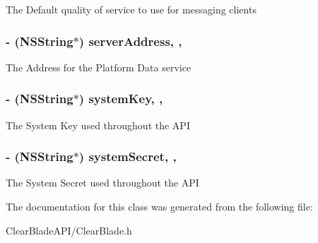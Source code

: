 The Default quality of service to use for messaging clients \hypertarget{interface_clear_blade_a254d692b3e85e4d33a4518e9ff9e4f40}{
\subsubsection[{server\+Address}]{\setlength{\rightskip}{0pt plus 5cm}-\/ (N\+S\+String$\ast$) server\+Address\hspace{0.3cm}{\ttfamily [read]}, {\ttfamily [atomic]}, {\ttfamily [assign]}}}\label{interface_clear_blade_a254d692b3e85e4d33a4518e9ff9e4f40}
The Address for the Platform Data service \hypertarget{interface_clear_blade_aab0eaf0d5cb8cabae0889b19230859b5}{
\subsubsection[{system\+Key}]{\setlength{\rightskip}{0pt plus 5cm}-\/ (N\+S\+String$\ast$) system\+Key\hspace{0.3cm}{\ttfamily [read]}, {\ttfamily [atomic]}, {\ttfamily [assign]}}}\label{interface_clear_blade_aab0eaf0d5cb8cabae0889b19230859b5}
The System Key used throughout the A\+P\+I \hypertarget{interface_clear_blade_ac86550adaf64238807f4bc536af7d1d0}{
\subsubsection[{system\+Secret}]{\setlength{\rightskip}{0pt plus 5cm}-\/ (N\+S\+String$\ast$) system\+Secret\hspace{0.3cm}{\ttfamily [read]}, {\ttfamily [atomic]}, {\ttfamily [assign]}}}\label{interface_clear_blade_ac86550adaf64238807f4bc536af7d1d0}
The System Secret used throughout the A\+P\+I 

The documentation for this class was generated from the following file\+:\begin{DoxyCompactItemize}
\item 
Clear\+Blade\+A\+P\+I/Clear\+Blade.\+h\end{DoxyCompactItemize}
